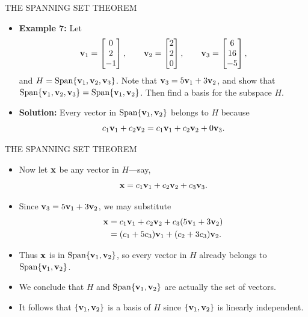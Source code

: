 \begin{frame}[shrink=15]{THE SPANNING SET THEOREM}
\begin{itemize}
\item \textbf{Example 7:} Let
\[
\mathbf{v}_1=\begin{bmatrix}0\\2\\-1\end{bmatrix},
\qquad
\mathbf{v}_2=\begin{bmatrix}2\\2\\0\end{bmatrix},
\qquad
\mathbf{v}_3=\begin{bmatrix}6\\16\\-5\end{bmatrix},
\]
and $H=\operatorname{Span}\{\mathbf{v}_1,\mathbf{v}_2,\mathbf{v}_3\}$. Note that $\mathbf{v}_3=5\mathbf{v}_1+3\mathbf{v}_2$, and show that $\operatorname{Span}\{\mathbf{v}_1,\mathbf{v}_2,\mathbf{v}_3\}=\operatorname{Span}\{\mathbf{v}_1,\mathbf{v}_2\}$. Then find a basis for the subspace $H$.
\item \textbf{Solution:} Every vector in $\operatorname{Span}\{\mathbf{v}_1,\mathbf{v}_2\}$ belongs to $H$ because
\[
c_1\mathbf{v}_1+c_2\mathbf{v}_2=c_1\mathbf{v}_1+c_2\mathbf{v}_2+0\mathbf{v}_3.
\]
\end{itemize}
\end{frame}

\begin{frame}[shrink=14]{THE SPANNING SET THEOREM}
\begin{itemize}
\item Now let $\mathbf{x}$ be any vector in $H$---say,
\[
\mathbf{x}=c_1\mathbf{v}_1+c_2\mathbf{v}_2+c_3\mathbf{v}_3.
\]
\item Since $\mathbf{v}_3=5\mathbf{v}_1+3\mathbf{v}_2$, we may substitute
\begin{align*}
\mathbf{x}&=c_1\mathbf{v}_1+c_2\mathbf{v}_2+c_3(5\mathbf{v}_1+3\mathbf{v}_2)\\
&=(c_1+5c_3)\mathbf{v}_1+(c_2+3c_3)\mathbf{v}_2.
\end{align*}
\item Thus $\mathbf{x}$ is in $\operatorname{Span}\{\mathbf{v}_1,\mathbf{v}_2\}$, so every vector in $H$ already belongs to $\operatorname{Span}\{\mathbf{v}_1,\mathbf{v}_2\}$.
\item We conclude that $H$ and $\operatorname{Span}\{\mathbf{v}_1,\mathbf{v}_2\}$ are actually the set of vectors.
\item It follows that $\{\mathbf{v}_1,\mathbf{v}_2\}$ is a basis of $H$ since $\{\mathbf{v}_1,\mathbf{v}_2\}$ is linearly independent.
\end{itemize}
\end{frame}

